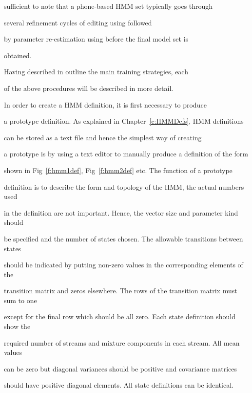 sufficient to note that a phone-based HMM set typically goes through


several refinement cycles of editing using  followed


by parameter re-estimation using  before the final model set is


obtained.





Having described in outline the main training strategies, each


of the above procedures will be described in more detail.










In order to create a HMM definition, it is first necessary to produce


a prototype definition.  As explained in Chapter~\ref{c:HMMDefs}, HMM definitions


can be stored as a text file and hence the simplest way of creating


a prototype is by using a text editor to manually produce a definition of the form


shown in Fig~\ref{f:hmm1def}, Fig~\ref{f:hmm2def} etc.  The function of a prototype


definition is to describe the form and topology of the HMM,  the actual numbers used


in the definition are not important.   Hence, the vector size and parameter kind should


be specified and the number of states chosen.  The allowable transitions between states


should be indicated by putting non-zero values in the corresponding elements of the


transition matrix and zeros elsewhere.  The rows of the transition matrix must sum to one


except for the final row which should be all zero.  Each state definition should show the


required number of streams and mixture components in each stream.  All mean values


can be zero but diagonal variances should be positive and covariance matrices


should have positive diagonal elements.  All state definitions can be identical.


